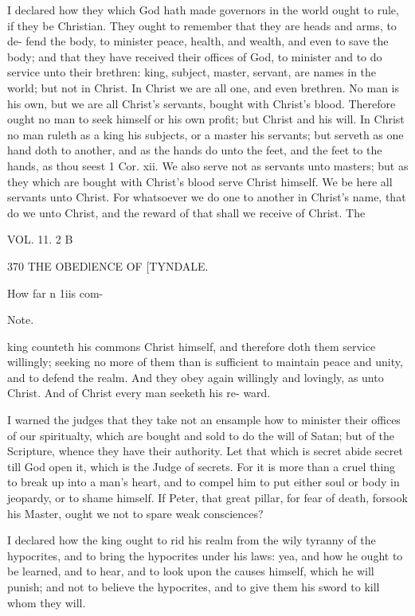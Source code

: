 \documentclass{custom}
\begin{document}
{I declared how they which God hath made governors in 
the world ought to rule, if they be Christian. They 
ought to remember that they are heads and arms, to de- 
fend the body, to minister peace, health, and wealth, and 
even to save the body; and that they have received their 
offices of God, to minister and to do service unto their 
brethren: king, subject, master, servant, are names in the 
world; but not in Christ. In Christ we are all one, and 
even brethren. No man is his own, but we are all 
Christ's servants, bought with Christ's blood. Therefore 
ought no man to seek himself or his own profit; but 
Christ and his will. In Christ no man ruleth as a king 
his subjects, or a master his servants; but serveth as one 
hand doth to another, and as the hands do unto the feet, 
and the feet to the hands, as thou seest 1 Cor. xii. We 
also serve not as servants unto masters; but as they which 
are bought with Christ's blood serve Christ himself. We 
be here all servants unto Christ. For whatsoever we do 
one to another in Christ's name, that do we unto Christ, 
and the reward of that shall we receive of Christ. The 

VOL. 11. 2 B 


370
THE OBEDlENCE OF
[TYNDALE.

How far n 
1iis com- 

Note. 

king counteth his commons Christ himself, and therefore 
doth them service willingly; seeking no more of them than 
is sufficient to maintain peace and unity, and to defend the 
realm. And they obey again willingly and lovingly, as 
unto Christ. And of Christ every man seeketh his re- 
ward. 

I warned the judges that they take not an ensample 
how to minister their offices of our spiritualty, which are 
bought and sold to do the will of Satan; but of the 
Scripture, whence they have their authority. Let that 
which is secret abide secret till God open it, which is the 
Judge of secrets. For it is more than a cruel thing to 
break up into a man's heart, and to compel him to put 
either soul or body in jeopardy, or to shame himself. If 
Peter, that great pillar, for fear of death, forsook his 
Master, ought we not to spare weak consciences? 

I declared how the king ought to rid his realm from the 
wily tyranny of the hypocrites, and to bring the hypocrites 
under his laws: yea, and how he ought to be learned, and 
to hear, and to look upon the causes himself, which he 
will punish; and not to believe the hypocrites, and to 
give them his sword to kill whom they will. 

}
\end{document}
